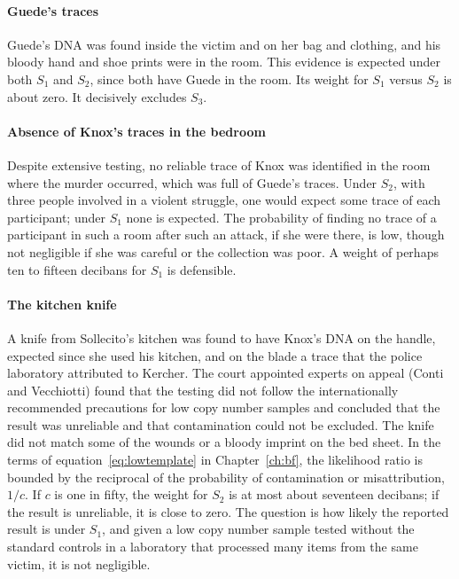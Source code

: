 \paragraph{Guede's traces} Guede's DNA was found inside the victim and on her bag and clothing, and his bloody hand and shoe prints were in the room. This evidence is expected under both $S_1$ and $S_2$, since both have Guede in the room. Its weight for $S_1$ versus $S_2$ is about zero. It decisively excludes $S_3$.

\paragraph{Absence of Knox's traces in the bedroom} Despite extensive testing, no reliable trace of Knox was identified in the room where the murder occurred, which was full of Guede's traces. Under $S_2$, with three people involved in a violent struggle, one would expect some trace of each participant; under $S_1$ none is expected. The probability of finding no trace of a participant in such a room after such an attack, if she were there, is low, though not negligible if she was careful or the collection was poor. A weight of perhaps ten to fifteen decibans for $S_1$ is defensible.

\paragraph{The kitchen knife} A knife from Sollecito's kitchen was found to have Knox's DNA on the handle, expected since she used his kitchen, and on the blade a trace that the police laboratory attributed to Kercher. The court appointed experts on appeal (Conti and Vecchiotti) found that the testing did not follow the internationally recommended precautions for low copy number samples and concluded that the result was unreliable and that contamination could not be excluded. The knife did not match some of the wounds or a bloody imprint on the bed sheet. In the terms of equation~\eqref{eq:lowtemplate} in Chapter~\ref{ch:bf}, the likelihood ratio is bounded by the reciprocal of the probability of contamination or misattribution, $1/c$. If $c$ is one in fifty, the weight for $S_2$ is at most about seventeen decibans; if the result is unreliable, it is close to zero. The question is how likely the reported result is under $S_1$, and given a low copy number sample tested without the standard controls in a laboratory that processed many items from the same victim, it is not negligible.


